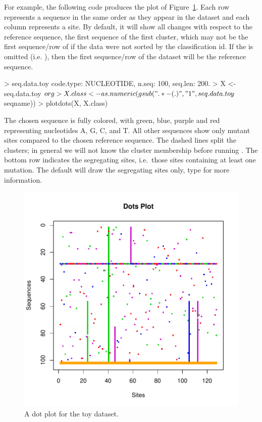 For example, the following code produces the plot of Figure~\ref{fig:toydots}.
Each row represents a sequence in the same order as they appear in the dataset
and each column represents a site.
By default, it will show all changes with respect to the reference sequence,
the first sequence of the first cluster,
which may not be the first sequence/row of  if the data were not
sorted by the classification id.
If the  is omitted (i.e. ), then the first
sequence/row of the dataset will be the reference sequence.
\begin{Code}
> seq.data.toy
code.type: NUCLEOTIDE, n.seq: 100, seq.len: 200.
> X <- seq.data.toy$org
> X.class <- as.numeric(gsub(".*-(.)", "\\1", seq.data.toy$seqname))
> plotdots(X, X.class)
\end{Code}

The chosen sequence is fully colored, with green, blue, purple and red representing 
nucleotides A, G, C, and T.
All other sequences show only mutant sites compared to the chosen reference sequence.
The dashed lines split the clusters; in general we will not know the cluster membership before running .
The bottom row indicates the segregating sites, i.e.\ those sites containing
at least one mutation.
The default will draw the segregating sites only,
type  for more information.
\begin{figure}[h]
\begin{center}
\includegraphics[width=5.0in]{./phyclust-include/f-toydots}
\caption{A dot plot for the toy dataset.}
\label{fig:toydots}
\end{center}
\end{figure}

